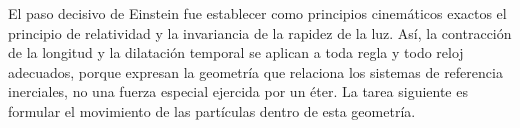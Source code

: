 El paso decisivo de Einstein fue establecer como principios cinemáticos exactos el principio de relatividad y la invariancia de la rapidez de la luz. Así, la contracción de la longitud y la dilatación temporal se aplican a toda regla y todo reloj adecuados, porque expresan la geometría que relaciona los sistemas de referencia inerciales, no una fuerza especial ejercida por un éter. La tarea siguiente es formular el movimiento de las partículas dentro de esta geometría.
